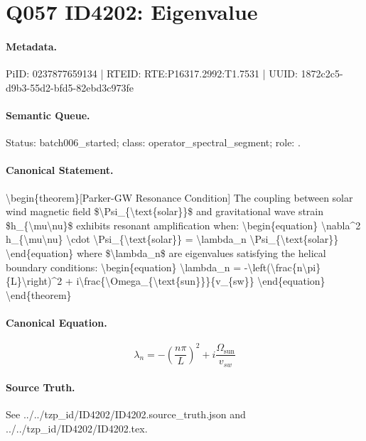 \section*{Q057 ID4202: Eigenvalue}
\paragraph{Metadata.}
PiID: 0237877659134 | RTEID: RTE:P16317.2992:T1.7531 | UUID: 1872c2c5-d9b3-55d2-bfd5-82ebd3c973fe

\paragraph{Semantic Queue.}
Status: batch006\_started; class: operator\_spectral\_segment; role: .

\paragraph{Canonical Statement.}
\textbackslash{}begin\{theorem\}[Parker-GW Resonance Condition] The coupling between solar wind magnetic field \$\textbackslash{}Psi\_\{\textbackslash{}text\{solar\}\}\$ and gravitational wave strain \$h\_\{\textbackslash{}mu\textbackslash{}nu\}\$ exhibits resonant amplification when: \textbackslash{}begin\{equation\} \textbackslash{}nabla\textasciicircum{}2 h\_\{\textbackslash{}mu\textbackslash{}nu\} \textbackslash{}cdot \textbackslash{}Psi\_\{\textbackslash{}text\{solar\}\} = \textbackslash{}lambda\_n \textbackslash{}Psi\_\{\textbackslash{}text\{solar\}\} \textbackslash{}end\{equation\} where \$\textbackslash{}lambda\_n\$ are eigenvalues satisfying the helical boundary conditions: \textbackslash{}begin\{equation\} \textbackslash{}lambda\_n = -\textbackslash{}left(\textbackslash{}frac\{n\textbackslash{}pi\}\{L\}\textbackslash{}right)\textasciicircum{}2 + i\textbackslash{}frac\{\textbackslash{}Omega\_\{\textbackslash{}text\{sun\}\}\}\{v\_\{sw\}\} \textbackslash{}end\{equation\} \textbackslash{}end\{theorem\}

\paragraph{Canonical Equation.}
\[
\begin{equation} \lambda_n = -\left(\frac{n\pi}{L}\right)^2 + i\frac{\Omega_{\text{sun}}}{v_{sw}} \end{equation}
\]

\paragraph{Source Truth.}
See ../../tzp\_id/ID4202/ID4202.source\_truth.json and ../../tzp\_id/ID4202/ID4202.tex.

